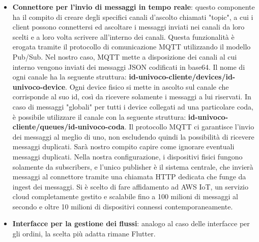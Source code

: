 \documentclass[a4paper, titlepage, 12pt, openright, twoside]{book}
\begin{document}
\begin{itemize}
	\item \textbf{Connettore per l'invio di messaggi in tempo reale}: questo componente ha il compito di creare degli specifici canali d'ascolto chiamati "topic",
				 a cui i client possono connettersi ed ascoltare i messaggi inviati nei canali da loro scelti e a loro volta scrivere all'interno dei canali. Questa funzionalità è erogata tramite il protocollo di comunicazione MQTT utilizzando il modello Pub/Sub. Nel nostro caso, MQTT mette a disposizione dei canali al cui interno vengono inviati
				 dei messaggi JSON codificati in base64. Il nome di ogni canale ha la seguente struttura: \textbf{id-univoco-cliente/devices/id-univoco-device}.
				 Ogni device fisico si mette in ascolto sul canale che corrisponde al suo id, così da ricevere solamente i messaggi a lui riservati. In caso di messaggi "globali"
				 per tutti i device collegati ad una particolare coda, è possibile utilizzare il canale con la seguente struttura: \textbf{id-univoco-cliente/queues/id-univoco-coda}.
				 Il protocollo MQTT ci garantisce l'invio dei messaggi al meglio di uno, non escludendo quindi la possibilità di ricevere messaggi duplicati. Sarà nostro compito
				 capire come ignorare eventuali messaggi duplicati. Nella nostra configurazione, i dispositivi fisici fungono solamente da subscribers, e l'unico publisher è 
				 il sistema centrale, che invierà messaggi al connettore tramite una chiamata HTTP dedicata che funge da ingest dei messaggi. 
				 Si è scelto di fare affidamento ad AWS IoT, un servizio cloud completamente gestito e scalabile fino a 100 milioni
				 di messaggi al secondo e oltre 10 milioni di dispositivi connessi contemporaneamente.
				 
	\item \textbf{Interfacce per la gestione dei flussi}: analogo al caso delle interfacce per gli ordini, la scelta più adatta rimane Flutter.
	
\end{itemize}
\end{document}
